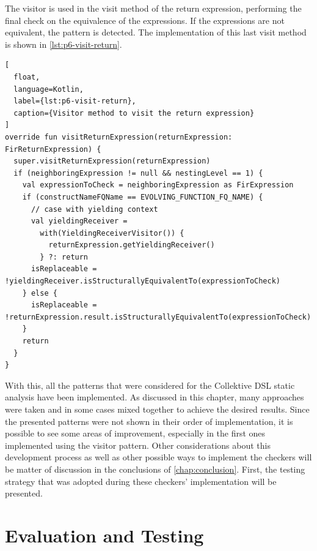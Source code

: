 \documentclass[12pt,a4paper,openright,twoside]{book}
\begin{document}


The visitor is used in the visit method of the return expression, performing the
final check on the equivalence of the expressions. If the expressions are not
equivalent, the pattern is detected. The implementation of this last visit method 
is shown in \cref{lst:p6-visit-return}.

\begin{lstlisting}[
  float, 
  language=Kotlin,
  label={lst:p6-visit-return},
  caption={Visitor method to visit the return expression}
]
override fun visitReturnExpression(returnExpression: FirReturnExpression) {
  super.visitReturnExpression(returnExpression)
  if (neighboringExpression != null && nestingLevel == 1) {
    val expressionToCheck = neighboringExpression as FirExpression
    if (constructNameFQName == EVOLVING_FUNCTION_FQ_NAME) {
      // case with yielding context
      val yieldingReceiver =
        with(YieldingReceiverVisitor()) {
          returnExpression.getYieldingReceiver()
        } ?: return
      isReplaceable = !yieldingReceiver.isStructurallyEquivalentTo(expressionToCheck)
    } else {
      isReplaceable = !returnExpression.result.isStructurallyEquivalentTo(expressionToCheck)
    }
    return
  }
}
\end{lstlisting}

With this, all the patterns that were considered for the Collektive DSL static
analysis have been implemented. As discussed in this chapter, many approaches
were taken and in some cases mixed together to achieve the desired results.
Since the presented patterns were not shown in their order of implementation, it
is possible to see some areas of improvement, especially in the first
ones implemented using the visitor pattern. 
%
Other considerations about this development process as well as other possible 
ways to implement the checkers will be matter of discussion in the conclusions 
of \cref{chap:conclusion}. First, the testing strategy that was adopted during 
these checkers' implementation will be presented.

\chapter{Evaluation and Testing}
\label{chap:evaluation}
\end{document}
